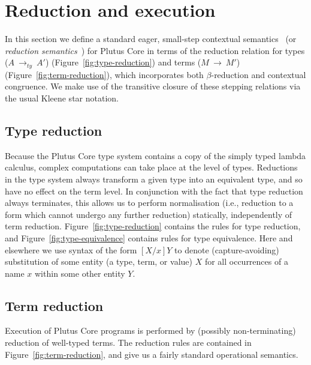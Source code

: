 \documentclass[a4paper]{article}
\newcommand{\typeStep}[2]{#1 ~ \rightarrow_{ty} ~ #2}
\newcommand{\step}[2]{#1 ~ \rightarrow ~ #2}
\begin{document}
\section{Reduction and execution}
\label{sec:reduction}

In this section we define a standard eager,
small-step contextual semantics~\citep[5.3]{Harper:PFPL} (or
\textit{reduction semantics}~\citep[\S2]{Felleisen-Hieb}) for Plutus
Core in terms of the reduction relation for types
(\(\typeStep{A}{A'}\)) (Figure~\ref{fig:type-reduction})
and terms (\(\step{M}{M'}\)) (Figure~\ref{fig:term-reduction}), which
incorporates both $\beta$-reduction and contextual congruence. We make
use of the transitive closure of these stepping relations via the
usual Kleene star notation.


\subsection{Type reduction}
Because the Plutus Core type system contains a copy of the simply
typed lambda calculus, complex computations can take place at the
level of types.  Reductions in the type system always transform a
given type into an equivalent type, and so have no effect on the term
level.  In conjunction with the fact that type reduction always
terminates, this allows us to perform normalisation (i.e., reduction
to a form which cannot undergo any further reduction) statically,
independently of term reduction.  Figure~\ref{fig:type-reduction}
contains the rules for type reduction, and
Figure~\ref{fig:type-equivalence} contains rules for type equivalence.
Here and elsewhere we use syntax of the form $[X/x]Y$ to denote
(capture-avoiding) substitution of some entity (a type, term, or
value) $X$ for all occurrences of a name $x$ within some other entity
$Y$.




\newpage
\subsection{Term reduction}
Execution of Plutus Core programs is performed by (possibly
non-terminating) reduction of well-typed terms.  The reduction rules
are contained in Figure~\ref{fig:term-reduction}, and give us a fairly
standard operational semantics.
\end{document}
